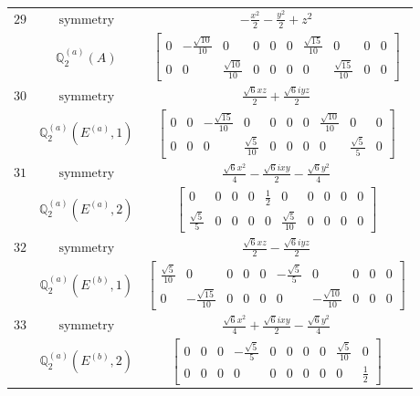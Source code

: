 \documentclass[fleqn,8pt,landscape]{jsarticle}
\begin{document}
\begin{longtable}{ccc}
$ 29 $ & $ \text{symmetry} $ & $ - \frac{x^{2}}{2} - \frac{y^{2}}{2} + z^{2} $ \\
$  $ & $ \mathbb{Q}_{2}^{(a)}(A) $ & $ \begin{bmatrix} 0 & - \frac{\sqrt{10}}{10} & 0 & 0 & 0 & 0 & \frac{\sqrt{15}}{10} & 0 & 0 & 0 \\ 0 & 0 & \frac{\sqrt{10}}{10} & 0 & 0 & 0 & 0 & \frac{\sqrt{15}}{10} & 0 & 0 \end{bmatrix} $ \\ \hline
$ 30 $ & $ \text{symmetry} $ & $ \frac{\sqrt{6} x z}{2} + \frac{\sqrt{6} i y z}{2} $ \\
$  $ & $ \mathbb{Q}_{2}^{(a)}(E^{(a)},1) $ & $ \begin{bmatrix} 0 & 0 & - \frac{\sqrt{15}}{10} & 0 & 0 & 0 & 0 & \frac{\sqrt{10}}{10} & 0 & 0 \\ 0 & 0 & 0 & \frac{\sqrt{5}}{10} & 0 & 0 & 0 & 0 & \frac{\sqrt{5}}{5} & 0 \end{bmatrix} $ \\ \hline
$ 31 $ & $ \text{symmetry} $ & $ \frac{\sqrt{6} x^{2}}{4} - \frac{\sqrt{6} i x y}{2} - \frac{\sqrt{6} y^{2}}{4} $ \\
$  $ & $ \mathbb{Q}_{2}^{(a)}(E^{(a)},2) $ & $ \begin{bmatrix} 0 & 0 & 0 & 0 & \frac{1}{2} & 0 & 0 & 0 & 0 & 0 \\ \frac{\sqrt{5}}{5} & 0 & 0 & 0 & 0 & \frac{\sqrt{5}}{10} & 0 & 0 & 0 & 0 \end{bmatrix} $ \\ \hline
$ 32 $ & $ \text{symmetry} $ & $ \frac{\sqrt{6} x z}{2} - \frac{\sqrt{6} i y z}{2} $ \\
$  $ & $ \mathbb{Q}_{2}^{(a)}(E^{(b)},1) $ & $ \begin{bmatrix} \frac{\sqrt{5}}{10} & 0 & 0 & 0 & 0 & - \frac{\sqrt{5}}{5} & 0 & 0 & 0 & 0 \\ 0 & - \frac{\sqrt{15}}{10} & 0 & 0 & 0 & 0 & - \frac{\sqrt{10}}{10} & 0 & 0 & 0 \end{bmatrix} $ \\ \hline
$ 33 $ & $ \text{symmetry} $ & $ \frac{\sqrt{6} x^{2}}{4} + \frac{\sqrt{6} i x y}{2} - \frac{\sqrt{6} y^{2}}{4} $ \\
$  $ & $ \mathbb{Q}_{2}^{(a)}(E^{(b)},2) $ & $ \begin{bmatrix} 0 & 0 & 0 & - \frac{\sqrt{5}}{5} & 0 & 0 & 0 & 0 & \frac{\sqrt{5}}{10} & 0 \\ 0 & 0 & 0 & 0 & 0 & 0 & 0 & 0 & 0 & \frac{1}{2} \end{bmatrix} $ \\ \hline

\end{longtable}
\end{document}
